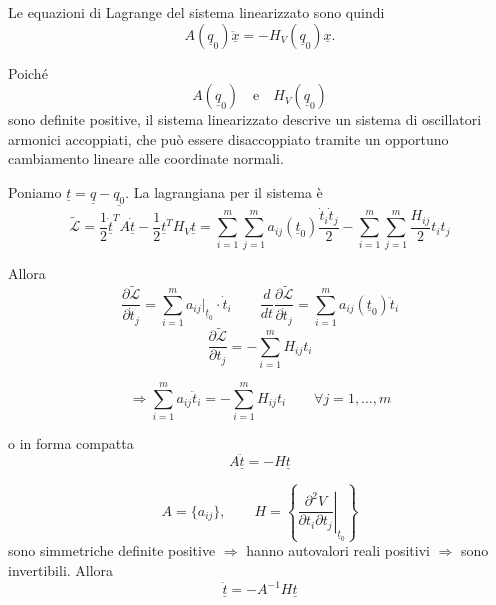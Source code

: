 Le equazioni di Lagrange del sistema linearizzato sono quindi
\[
A(\underline q_0)\ddot{\underline x}
=
-
H_V(\underline q_0)\underline x.
\]

Poiché
\[
A(\underline q_0)
\quad\text{e}\quad
H_V(\underline q_0)
\]
sono definite positive, il sistema linearizzato descrive un sistema di oscillatori armonici accoppiati, che può essere disaccoppiato tramite un opportuno cambiamento lineare alle coordinate normali.

Poniamo $\underline{t} = \underline{q} - \underline{q_0}$. La lagrangiana per il sistema è
\[
\tilde{\mathcal{L}}
=
\frac{1}{2}\dot{\underline t}^{T}A\dot{\underline t}
-
\frac{1}{2}\underline t^{T}H_V\underline t
=
\sum_{i=1}^{m}\sum_{j=1}^{m}
a_{ij}(\underline t_0)\frac{\dot t_i\dot t_j}{2}
-
\sum_{i=1}^{m}\sum_{j=1}^{m}
\frac{H_{ij}}{2}t_it_j
\]

Allora
\[
\frac{\partial\tilde{\mathcal{L}}}{\partial\dot t_j}
=
\sum_{i=1}^{m}a_{ij}\big|_{\underline t_0}\cdot\dot t_i
\qquad
\frac{d}{dt}\frac{\partial\tilde{\mathcal{L}}}{\partial\dot t_j}
=
\sum_{i=1}^{m}a_{ij}(\underline t_0)\ddot t_i
\]
\[
\frac{\partial\tilde{\mathcal{L}}}{\partial t_j}
=
-\sum_{i=1}^{m}H_{ij}t_i
\]

\[
\Rightarrow
\sum_{i=1}^{m}a_{ij}\ddot t_i
=
-\sum_{i=1}^{m}H_{ij}t_i
\qquad
\forall j=1,\ldots,m
\]

o in forma compatta
\[
A\ddot{\underline t}=-H\underline t
\]

\[
A=\{a_{ij}\},
\qquad
H=
\left\{
\left.
\frac{\partial^2 V}{\partial t_i\partial t_j}
\right|_{\underline t_0}
\right\}
\]
sono simmetriche definite positive \(\Rightarrow\) hanno autovalori reali positivi \(\Rightarrow\) sono invertibili. Allora
\[
\ddot{\underline t}=-A^{-1}H\underline t
\]

